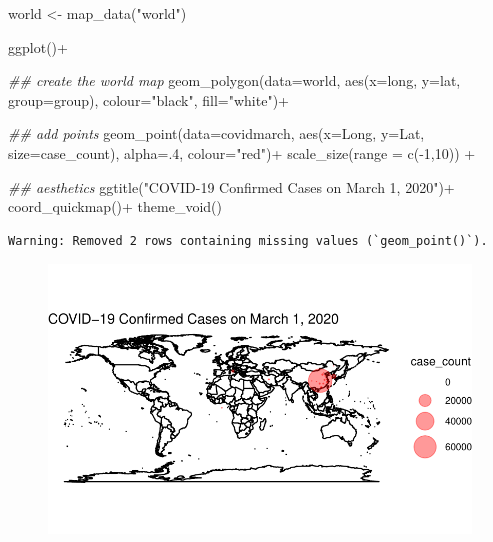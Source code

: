 \documentclass[
  letterpaper,
  DIV=11,
  numbers=noendperiod]{scrreprt}
\newenvironment{Shaded}{\begin{snugshade}}{\end{snugshade}}
\newcommand{\AttributeTok}[1]{\textcolor[rgb]{0.40,0.45,0.13}{#1}}
\newcommand{\DecValTok}[1]{\textcolor[rgb]{0.68,0.00,0.00}{#1}}
\newcommand{\DocumentationTok}[1]{\textcolor[rgb]{0.37,0.37,0.37}{\textit{#1}}}
\newcommand{\FunctionTok}[1]{\textcolor[rgb]{0.28,0.35,0.67}{#1}}
\newcommand{\NormalTok}[1]{\textcolor[rgb]{0.00,0.23,0.31}{#1}}
\newcommand{\OtherTok}[1]{\textcolor[rgb]{0.00,0.23,0.31}{#1}}
\newcommand{\SpecialCharTok}[1]{\textcolor[rgb]{0.37,0.37,0.37}{#1}}
\newcommand{\StringTok}[1]{\textcolor[rgb]{0.13,0.47,0.30}{#1}}
\begin{document}
\begin{Shaded}
\begin{Highlighting}[]
\NormalTok{world }\OtherTok{\textless{}{-}} \FunctionTok{map\_data}\NormalTok{(}\StringTok{"world"}\NormalTok{)}

\FunctionTok{ggplot}\NormalTok{()}\SpecialCharTok{+}
  
  \DocumentationTok{\#\# create the world map}
  \FunctionTok{geom\_polygon}\NormalTok{(}\AttributeTok{data=}\NormalTok{world, }\FunctionTok{aes}\NormalTok{(}\AttributeTok{x=}\NormalTok{long, }\AttributeTok{y=}\NormalTok{lat, }\AttributeTok{group=}\NormalTok{group), }\AttributeTok{colour=}\StringTok{"black"}\NormalTok{, }\AttributeTok{fill=}\StringTok{"white"}\NormalTok{)}\SpecialCharTok{+}
  
  \DocumentationTok{\#\# add points}
  \FunctionTok{geom\_point}\NormalTok{(}\AttributeTok{data=}\NormalTok{covidmarch, }\FunctionTok{aes}\NormalTok{(}\AttributeTok{x=}\NormalTok{Long, }\AttributeTok{y=}\NormalTok{Lat, }\AttributeTok{size=}\NormalTok{case\_count), }\AttributeTok{alpha=}\NormalTok{.}\DecValTok{4}\NormalTok{, }\AttributeTok{colour=}\StringTok{"red"}\NormalTok{)}\SpecialCharTok{+}
  \FunctionTok{scale\_size}\NormalTok{(}\AttributeTok{range =} \FunctionTok{c}\NormalTok{(}\SpecialCharTok{{-}}\DecValTok{1}\NormalTok{,}\DecValTok{10}\NormalTok{)) }\SpecialCharTok{+}
  
  \DocumentationTok{\#\# aesthetics}
  \FunctionTok{ggtitle}\NormalTok{(}\StringTok{"COVID{-}19 Confirmed Cases on March 1, 2020"}\NormalTok{)}\SpecialCharTok{+}
  \FunctionTok{coord\_quickmap}\NormalTok{()}\SpecialCharTok{+}
  \FunctionTok{theme\_void}\NormalTok{()}
\end{Highlighting}
\end{Shaded}

\begin{verbatim}
Warning: Removed 2 rows containing missing values (`geom_point()`).
\end{verbatim}

\begin{figure}[H]

{\centering \includegraphics{12-Maps_files/figure-pdf/unnamed-chunk-37-1.pdf}

}

\end{figure}
\end{document}
